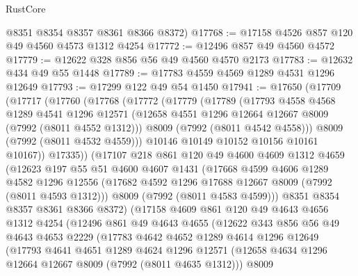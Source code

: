 \begin{lexlean}{RustCore}
\begin{coremodule}
      @8351
      @8354
      @8357
      @8361
      @8366
      @8372)
@17768 := @17158 @4526 @857 @120 @49 @4560 @4573 @1312 @4254
@17772 := @12496 @857 @49 @4560 @4572
@17779 := @12622 @328 @856 @56 @49 @4560 @4570 @2173
@17783 := @12632 @434 @49 @55 @1448
@17789 := @17783 @4559 @4569 @1289 @4531 @1296 @12649
@17793 := @17299 @122 @49 @54 @1450
@17941 := @17650
    (@17709
      (@17717
        (@17760
          (@17768
            (@17772
              (@17779
                (@17789
                  (@17793
                    @4558
                    @4568
                    @1289
                    @4541
                    @1296
                    @12571
                    (@12658 @4551 @1296 @12664 @12667 @8009 (@7992 (@8011 @4552 @1312)))
                    @8009
                    (@7992 (@8011 @4542 @4558)))
                  @8009
                  (@7992 (@8011 @4532 @4559)))
                @10146
                @10149
                @10152
                @10156
                @10161
                @10167))
            @17335))
        (@17107
          @218
          @861
          @120
          @49
          @4600
          @4609
          @1312
          @4659
          (@12623
            @197
            @55
            @51
            @4600
            @4607
            @1431
            (@17668
              @4599
              @4606
              @1289
              @4582
              @1296
              @12556
              (@17682 @4592 @1296 @17688 @12667 @8009 (@7992 (@8011 @4593 @1312)))
              @8009
              (@7992 (@8011 @4583 @4599)))
            @8351
            @8354
            @8357
            @8361
            @8366
            @8372)
          (@17158
            @4609
            @861
            @120
            @49
            @4643
            @4656
            @1312
            @4254
            (@12496
              @861
              @49
              @4643
              @4655
              (@12622
                @343
                @856
                @56
                @49
                @4643
                @4653
                @2229
                (@17783
                  @4642
                  @4652
                  @1289
                  @4614
                  @1296
                  @12649
                  (@17793
                    @4641
                    @4651
                    @1289
                    @4624
                    @1296
                    @12571
                    (@12658 @4634 @1296 @12664 @12667 @8009 (@7992 (@8011 @4635 @1312)))
                    @8009

\end{coremodule}
\end{lexlean}
